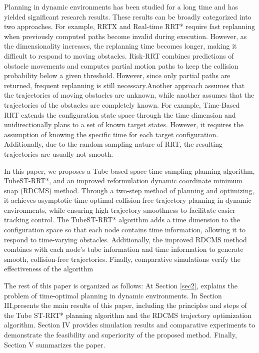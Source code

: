\documentclass[conference]{IEEEtran}
\begin{document}
        Planning in dynamic environments has been studied for a long time and has yielded significant research results. These results can be broadly categorized into two approaches. For example, RRTX\cite{b3} and Real-time RRT* \cite{b4} require fast replanning when previously computed paths become invalid during execution. However, as the dimensionality increases, the replanning time becomes longer, making it difficult to respond to moving obstacles. Risk-RRT \cite{b5} combines predictions of obstacle movements and computes partial motion paths to keep the collision probability below a given threshold. However, since only partial paths are returned, frequent replanning is still necessary.Another approach assumes that the trajectories of moving obstacles are unknown, while another assumes that the trajectories of the obstacles are completely known. For example, Time-Based RRT \cite{b6} extends the configuration state space through the time dimension and unidirectionally plans to a set of known target states. However, it requires the assumption of knowing the specific time for each target configuration. Additionally, due to the random sampling nature of RRT, the resulting trajectories are usually not smooth.

        In this paper, we proposes a Tube-based space-time sampling planning algorithm, TubeST-RRT*, and an improved reformulation dynamic coordinate minimum snap (RDCMS) method. Through a two-step method of  planning and optimizing, it achieves asymptotic time-optimal collision-free trajectory planning in dynamic environments, while ensuring high trajectory smoothness to facilitate easier tracking control. The TubeST-RRT* algorithm adds a time dimension to the configuration space so that each node contains time information, allowing it to respond to time-varying obstacles. Additionally, the improved RDCMS method combines with each node's tube information and time information to generate smooth, collision-free trajectories. Finally, comparative simulations verify the effectiveness of the algorithm

        The rest of this paper is organized as follows: At Section \ref{sec2}, explains the problem of time-optimal planning in dynamic environments. In Section III,presents the main results of this paper, including the principles and steps of the Tube ST-RRT* planning algorithm and the RDCMS trajectory optimization algorithm. Section IV provides simulation results and comparative experiments to demonstrate the feasibility and superiority of the proposed method. Finally, Section V summarizes the paper.
\end{document}
